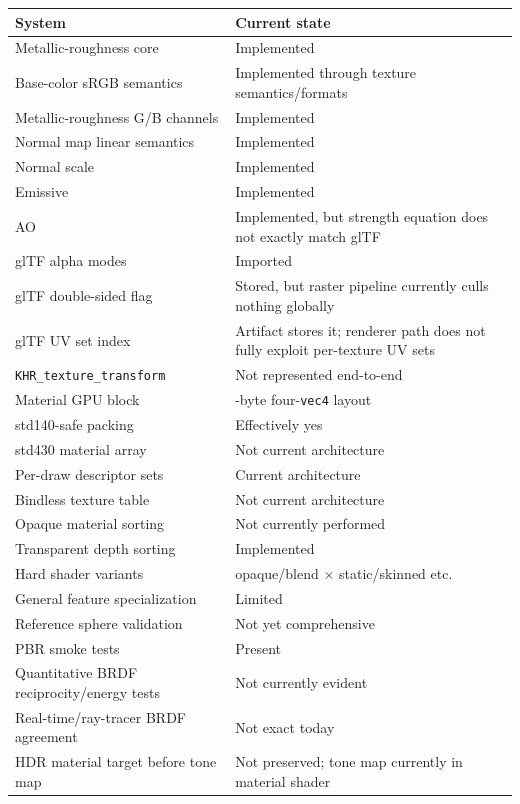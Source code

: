 {\def\LTcaptype{none} %
\begin{longtable}[]{@{}
  >{\raggedright\arraybackslash}p{}
  >{\raggedright\arraybackslash}p{}@{}}
\toprule\noalign{}
\begin{minipage}[b]{\linewidth}\raggedright
System
\end{minipage} & \begin{minipage}[b]{\linewidth}\raggedright
Current state
\end{minipage} \\
\midrule\noalign{}
\endhead
\bottomrule\noalign{}
\endlastfoot
Metallic-roughness core & Implemented \\
Base-color sRGB semantics & Implemented through texture semantics/formats \\
Metallic-roughness G/B channels & Implemented \\
Normal map linear semantics & Implemented \\
Normal scale & Implemented \\
Emissive & Implemented \\
AO & Implemented, but strength equation does not exactly match glTF \\
glTF alpha modes & Imported \\
glTF double-sided flag & Stored, but raster pipeline currently culls nothing globally \\
glTF UV set index & Artifact stores it; renderer path does not fully exploit per-texture UV sets \\
\texttt{KHR\_texture\_transform} & Not represented end-to-end \\
Material GPU block & 64-byte four-\texttt{vec4} layout \\
std140-safe packing & Effectively yes \\
std430 material array & Not current architecture \\
Per-draw descriptor sets & Current architecture \\
Bindless texture table & Not current architecture \\
Opaque material sorting & Not currently performed \\
Transparent depth sorting & Implemented \\
Hard shader variants & opaque/blend × static/skinned etc. \\
General feature specialization & Limited \\
Reference sphere validation & Not yet comprehensive \\
PBR smoke tests & Present \\
Quantitative BRDF reciprocity/energy tests & Not currently evident \\
Real-time/ray-tracer BRDF agreement & Not exact today \\
HDR material target before tone map & Not preserved; tone map currently in material shader \\
\end{longtable}
}

